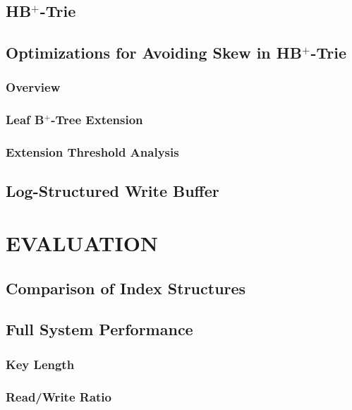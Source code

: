 \documentclass[lang=cn]{cls/elegantpaper}
\begin{document}
\subsection{HB$^+$-Trie}

\subsection{Optimizations for Avoiding Skew in HB$^+$-Trie}

\subsubsection{Overview}

\subsubsection{Leaf B$^+$-Tree Extension}

\subsubsection{Extension Threshold Analysis}

\subsection{Log-Structured Write Buffer}

\newpage

\section{EVALUATION}

\subsection{Comparison of Index Structures}

\subsection{Full System Performance}

\subsubsection{Key Length}

\subsubsection{Read/Write Ratio}
\end{document}
